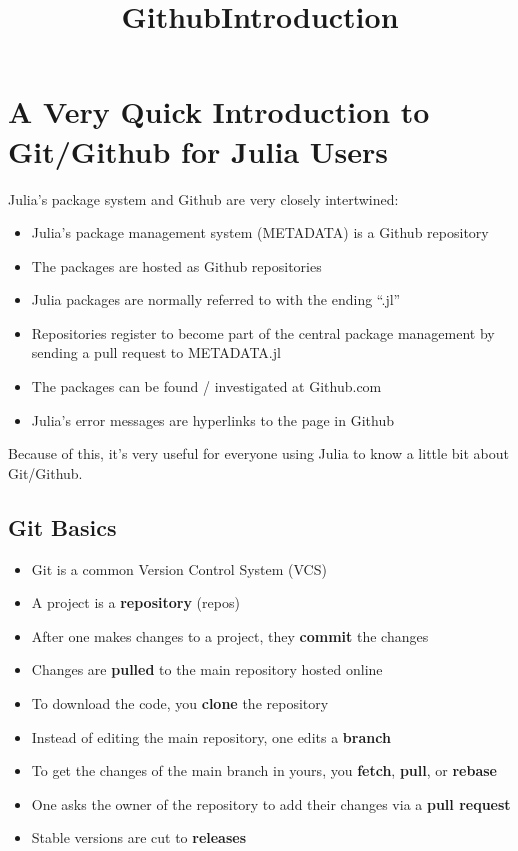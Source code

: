 \documentclass[11pt]{article}
\title{GithubIntroduction}
\begin{document}
    
    
    \maketitle
    
    

    
    \section{A Very Quick Introduction to Git/Github for Julia
Users}\label{a-very-quick-introduction-to-gitgithub-for-julia-users}

Julia's package system and Github are very closely intertwined:

\begin{itemize}
\itemsep1pt\parskip0pt
\item
  Julia's package management system (METADATA) is a Github repository
\item
  The packages are hosted as Github repositories
\item
  Julia packages are normally referred to with the ending ``.jl''
\item
  Repositories register to become part of the central package management
  by sending a pull request to METADATA.jl
\item
  The packages can be found / investigated at Github.com
\item
  Julia's error messages are hyperlinks to the page in Github
\end{itemize}

Because of this, it's very useful for everyone using Julia to know a
little bit about Git/Github.

    \subsection{Git Basics}\label{git-basics}

\begin{itemize}
\itemsep1pt\parskip0pt
\item
  Git is a common Version Control System (VCS)
\item
  A project is a \textbf{repository} (repos)
\item
  After one makes changes to a project, they \textbf{commit} the changes
\item
  Changes are \textbf{pulled} to the main repository hosted online
\item
  To download the code, you \textbf{clone} the repository
\item
  Instead of editing the main repository, one edits a \textbf{branch}
\item
  To get the changes of the main branch in yours, you \textbf{fetch},
  \textbf{pull}, or \textbf{rebase}
\item
  One asks the owner of the repository to add their changes via a
  \textbf{pull request}
\item
  Stable versions are cut to \textbf{releases}
\end{itemize}
\end{document}
